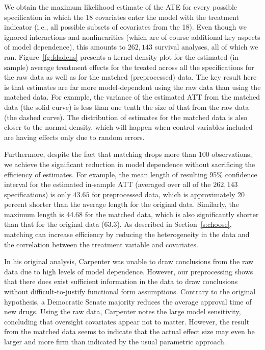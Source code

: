 \documentclass[11pt,titlepage]{article}
\begin{document}
We obtain the maximum likelihood estimate of the ATE for every
possible specification in which the 18 covariates enter the model with
the treatment indicator (i.e., all possible subsets of covariates from
the 18).  Even though we ignored interactions and nonlinearities
(which are of course additional key aspects of model dependence), this
amounts to $262,143$ survival analyses, all of which we ran.
Figure~\ref{fg:fdadens} presents a kernel density plot for the
estimated (in-sample) average treatment effects for the treated across
all the specifications for the raw data as well as for the matched
(preprocessed) data.  The key result here is that estimates are far
more model-dependent using the raw data than using the matched data.
For example, the variance of the estimated ATT from the matched data
(the solid curve) is less than one tenth the size of that from the raw
data (the dashed curve).  The distribution of estimates for the
matched data is also closer to the normal density, which will happen
when control variables included are having effects only due to random
errors.

Furthermore, despite the fact that matching drops more than 100
observations, we achieve the significant reduction in model dependence
without sacrificing the efficiency of estimates. For example, the
mean length of resulting 95\% confidence interval for the estimated
in-sample ATT (averaged over all of the $262,143$ specifications) is
only $43.65$ for preprocessed data, which is approximately 20 percent
shorter than the average length for the original data. Similarly, the
maximum length is 44.68 for the matched data, which is also
significantly shorter than that for the original data (63.3). As
described in Section~\ref{s:choose}, matching can increase efficiency
by reducing the heterogeneity in the data and the correlation between
the treatment variable and covariates.

In his original analysis, Carpenter was unable to draw conclusions
from the raw data due to high levels of model dependence.  However,
our preprocessing shows that there does exist sufficient information
in the data to draw conclusions without difficult-to-justify
functional form assumptions.  Contrary to the original hypothesis, a
Democratic Senate majority reduces the average approval time of new
drugs.  Using the raw data, Carpenter notes the large model
sensitivity, concluding that oversight covariates appear not to
matter.  However, the result from the matched data seems to indicate
that the actual effect size may even be larger and more firm than
indicated by the usual parametric approach.
\end{document}
